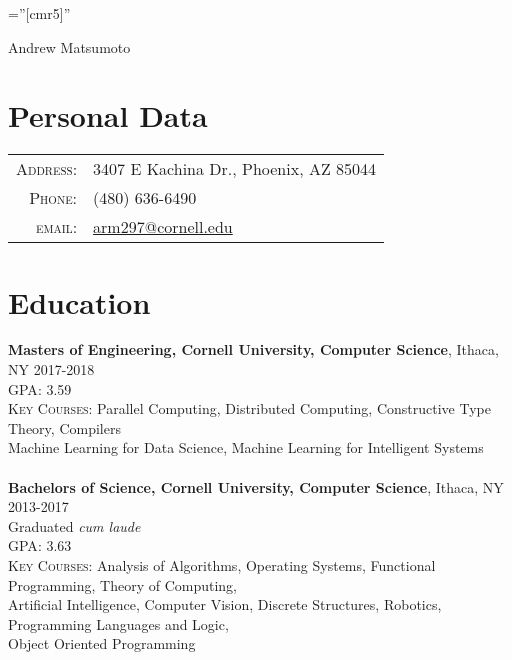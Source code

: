 \documentclass[article,8pt]{article}
\begin{document}

\pagestyle{empty} %

\font\fb=''[cmr5]'' %

\par{\centering
		{\Huge Andrew Matsumoto}
	\bigskip\par}

\section{Personal Data}

\begin{tabular}{rl}
    \textsc{Address:}   & 3407 E Kachina Dr., Phoenix, AZ 85044\\
    \textsc{Phone:}     & (480) 636-6490\\
    \textsc{email:}     & \href{mailto:arm297@cornell.edu}{arm297@cornell.edu}
\end{tabular}

\section{Education}
\textbf{Masters of Engineering, Cornell University, Computer Science}, Ithaca, NY 2017-2018\\
\hspace*{1em}\textsc{GPA}: 3.59\\
\hspace*{1em}\textsc{Key Courses}: Parallel Computing, Distributed Computing, Constructive Type Theory, Compilers\\
\hspace*{1em}Machine Learning for Data Science, Machine Learning for Intelligent Systems
\\\\
\textbf{Bachelors of Science, Cornell University, Computer Science}, Ithaca, NY 2013-2017\\
\hspace*{1em}Graduated \textit{cum laude}\\
\hspace*{1em}\textsc{GPA}: 3.63\\
\hspace*{1em}\textsc{Key Courses}: Analysis of Algorithms, Operating Systems, Functional Programming, Theory of Computing,\\
\hspace*{1em}Artificial Intelligence, Computer Vision, Discrete Structures, Robotics, Programming Languages and Logic,\\
\hspace*{1em}Object Oriented Programming
\end{document}
